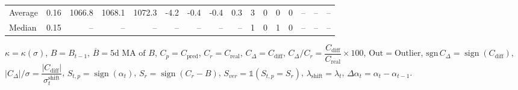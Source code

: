 \begin{threeparttable}
{\begin{tabular}{lrrrrrrrrrrrrrrr}
Average &     0.16 & 1066.8 & 1068.1 & 1072.3 &       -4.2 &           -0.4 &                     -0.4 &                 0.3 &              3 &         0 &     0 &         0 &         -- &        -- &             -- \\
 Median &     0.15 &     -- &     -- &     -- &         -- &             -- &                       -- &                  -- &              1 &         0 &     1 &         0 &         -- &        -- &             -- \\
\bottomrule
\end{tabular}
}
\begin{tablenotes}\footnotesize
\item $\kappa=\kappa(\sigma)$, $B=B_{t-1}$, $\overline{B}=\text{5d MA of }B$, $C_p=C_{\text{pred}}$, $C_r=C_{\text{real}}$, $C_\Delta=C_{\text{diff}}$, $C_\Delta/C_r=\dfrac{C_{\text{diff}}}{C_{\text{real}}}\times100$, $\mathrm{Out}=\text{Outlier}$, $\mathrm{sgn}\,C_\Delta=\operatorname{sign}(C_{\text{diff}})$, $|C_\Delta|/\sigma=\dfrac{|C_{\text{diff}}|}{\sigma_t^{\text{shift}}}$, $S_{t,p}=\operatorname{sign}(\alpha_t)$, $S_r=\operatorname{sign}(C_r - B)$, $S_{ver}=\mathbb{1}(S_{t,p}=S_r)$, $\lambda_{\text{shift}}=\lambda_t$, $\Delta\alpha_t=\alpha_t-\alpha_{t-1}$.\end{tablenotes}
\end{threeparttable}
\endgroup

